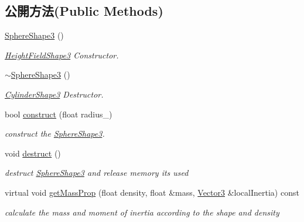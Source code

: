 \subsection*{公開方法(Public Methods)}
\begin{DoxyCompactItemize}
\item 
\hyperlink{class_i_dream_sky_1_1_sphere_shape3_ab6d90a67d60cc8de4bb370e8b9c1dfbf}{Sphere\+Shape3} ()
\begin{DoxyCompactList}\small\item\em \hyperlink{class_i_dream_sky_1_1_height_field_shape3}{Height\+Field\+Shape3} Constructor. \end{DoxyCompactList}\item 
\hyperlink{class_i_dream_sky_1_1_sphere_shape3_a6355fb0798b10b91dd7e7fce4ccf5caa}{$\sim$\+Sphere\+Shape3} ()
\begin{DoxyCompactList}\small\item\em \hyperlink{class_i_dream_sky_1_1_cylinder_shape3}{Cylinder\+Shape3} Destructor. \end{DoxyCompactList}\item 
bool \hyperlink{class_i_dream_sky_1_1_sphere_shape3_a865dbf5803d524443d710c9326c18f33}{construct} (float radius\+\_\+)
\begin{DoxyCompactList}\small\item\em construct the \hyperlink{class_i_dream_sky_1_1_sphere_shape3}{Sphere\+Shape3}. \end{DoxyCompactList}\item 
void \hyperlink{class_i_dream_sky_1_1_sphere_shape3_a9fd6c7f9fc7abc9deb1e87331586b1cd}{destruct} ()\hypertarget{class_i_dream_sky_1_1_sphere_shape3_a9fd6c7f9fc7abc9deb1e87331586b1cd}{}\label{class_i_dream_sky_1_1_sphere_shape3_a9fd6c7f9fc7abc9deb1e87331586b1cd}

\begin{DoxyCompactList}\small\item\em destruct \hyperlink{class_i_dream_sky_1_1_sphere_shape3}{Sphere\+Shape3} and release memory its used \end{DoxyCompactList}\item 
virtual void \hyperlink{class_i_dream_sky_1_1_sphere_shape3_a6588ac697b663d9318883c8783e76fa6}{get\+Mass\+Prop} (float density, float \&mass, \hyperlink{class_i_dream_sky_1_1_vector3}{Vector3} \&local\+Inertia) const 
\begin{DoxyCompactList}\small\item\em calculate the mass and moment of inertia according to the shape and density \end{DoxyCompactList}\end{DoxyCompactItemize}
